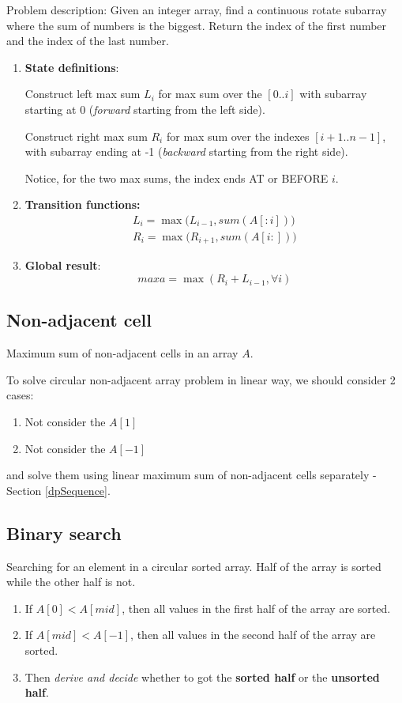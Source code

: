 Problem description: Given an integer array, find a continuous rotate subarray where the sum of numbers is the biggest. Return the index of the first number and the index of the last number. 
\begin{enumerate}
\item \textbf{State definitions}: 

Construct left max sum $L_i$ for max sum over the $[0..i]$ with subarray starting at 0 (\textit{forward} starting from the left side). 

Construct right max sum $R_i$ for max sum over the indexes $[i+1..n -1]$, with subarray ending at -1 (\textit{backward} starting from the right side). 

Notice, for the two max sums, the index ends AT or BEFORE $i$.

\item \textbf{Transition functions:}
\begin{align*}
L_i = \max\Big(L_{i-1}, sum(A[:i])\Big) \\ 
R_i = \max\Big(R_{i+1}, sum(A[i:])\Big)
\end{align*}

\item \textbf{Global result}: 
$$maxa = \max(R_i+L_{i-1}, \forall i)$$
\end{enumerate}

\subsection{Non-adjacent cell}
Maximum sum of non-adjacent cells in an array $A$.

To solve circular non-adjacent array problem in linear way, we should consider 2 cases:
\begin{enumerate}
\item Not consider the $A[1]$
\item Not consider the $A[-1]$ 
\end{enumerate}
and solve them using linear maximum sum of non-adjacent cells separately  - Section \ref{dpSequence}. 
\subsection{Binary search}
Searching for an element in a circular sorted array. Half of the array is sorted while the other half is not.
\begin{enumerate}
\item If $A[0] < A[mid]$, then all values in the first half of the array are sorted.
\item If $A[mid] < A[-1]$, then all values in the second half of the array are sorted.
\item Then \textit{derive and decide} whether to got the \textbf{sorted half} or the \textbf{unsorted half}.
\end{enumerate}

